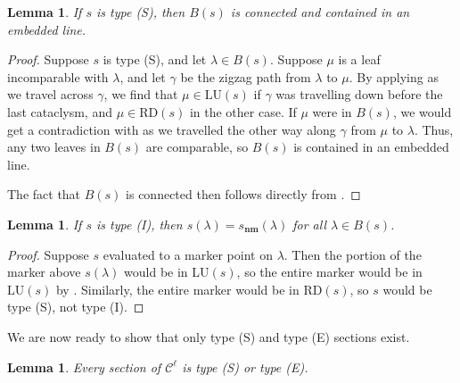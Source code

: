 \documentclass[11pt]{amsart}
\renewcommand{\l}{\lambda}
\newcommand{\mc}{\mathcal}
\newcommand{\lu}{\mathrm{LU}}
\newcommand{\rd}{\mathrm{RD}}
\newcommand{\snm}{s_\mathbf{nm}}
\numberwithin{equation}{section}
\newtheorem{lemma}[equation]{Lemma}
\theoremstyle{definition}
\begin{document}
\begin{lemma}\label{lem:type_s_in_line}
	If $s$ is type (S), then $B(s)$ is connected and contained in an embedded line.
\end{lemma}

\begin{proof}
	Suppose $s$ is type (S), and let $\l\in B(s)$. Suppose $\mu$ is a leaf incomparable with $\l$, and let $\gamma$ be the zigzag path from $\l$ to $\mu$. By applying  as we travel across $\gamma$, we find that $\mu\in\lu(s)$ if $\gamma$ was travelling down before the last cataclysm, and $\mu\in\rd(s)$ in the other case. If $\mu$ were in $B(s)$, we would get a contradiction with  as we travelled the other way along $\gamma$ from $\mu$ to $\l$. Thus, any two leaves in $B(s)$ are comparable, so $B(s)$ is contained in an embedded line.
	
	The fact that $B(s)$ is connected then follows directly from .
\end{proof}

\begin{lemma}\label{lem:type_i_in_snm}
	If $s$ is type (I), then $s(\l)=\snm(\l)$ for all $\l\in B(s)$.
\end{lemma}

\begin{proof}

	
	Suppose $s$ evaluated to a marker point on $\l$. Then the portion of the marker above $s(\l)$ would be in $\lu(s)$, so the entire marker would be in $\lu(s)$ by . Similarly, the entire marker would be in $\rd(s)$, so $s$ would be type (S), not type (I).
\end{proof}


 
We are now ready to show that only type (S) and type (E) sections exist.

\begin{lemma}\label{lem:no_i}
	Every section of $\mc C^\ell$ is type (S) or type (E).
\end{lemma}
\end{document}
